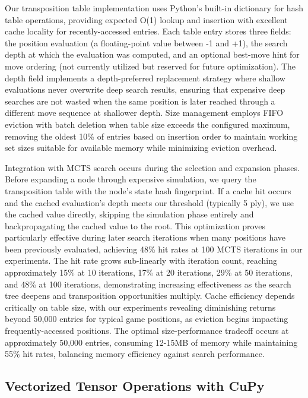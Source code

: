 \documentclass{article}
\begin{document}
Our transposition table implementation uses Python's built-in dictionary for hash table operations, providing expected O(1) lookup and insertion with excellent cache locality for recently-accessed entries. Each table entry stores three fields: the position evaluation (a floating-point value between -1 and +1), the search depth at which the evaluation was computed, and an optional best-move hint for move ordering (not currently utilized but reserved for future optimization). The depth field implements a depth-preferred replacement strategy where shallow evaluations never overwrite deep search results, ensuring that expensive deep searches are not wasted when the same position is later reached through a different move sequence at shallower depth. Size management employs FIFO eviction with batch deletion when table size exceeds the configured maximum, removing the oldest 10\% of entries based on insertion order to maintain working set sizes suitable for available memory while minimizing eviction overhead.

Integration with MCTS search occurs during the selection and expansion phases. Before expanding a node through expensive simulation, we query the transposition table with the node's state hash fingerprint. If a cache hit occurs and the cached evaluation's depth meets our threshold (typically 5 ply), we use the cached value directly, skipping the simulation phase entirely and backpropagating the cached value to the root. This optimization proves particularly effective during later search iterations when many positions have been previously evaluated, achieving 48\% hit rates at 100 MCTS iterations in our experiments. The hit rate grows sub-linearly with iteration count, reaching approximately 15\% at 10 iterations, 17\% at 20 iterations, 29\% at 50 iterations, and 48\% at 100 iterations, demonstrating increasing effectiveness as the search tree deepens and transposition opportunities multiply. Cache efficiency depends critically on table size, with our experiments revealing diminishing returns beyond 50,000 entries for typical game positions, as eviction begins impacting frequently-accessed positions. The optimal size-performance tradeoff occurs at approximately 50,000 entries, consuming 12-15MB of memory while maintaining 55\% hit rates, balancing memory efficiency against search performance.

\subsection{Vectorized Tensor Operations with CuPy}
\end{document}

